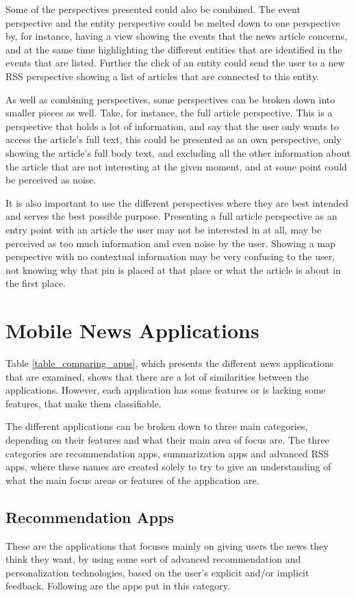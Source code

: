 Some of the perspectives presented could also be combined. The event perspective and the entity perspective could be melted down to one perspective by, for instance, having a view showing the events that the news article concerns, and at the same time highlighting the different entities that are identified in the events that are listed. Further the click of an entity could send the user to a new RSS perspective showing a list of articles that are connected to this entity.

As well as combining perspectives, some perspectives can be broken down into smaller pieces as well. Take, for instance, the full article perspective. This is a perspective that holds a lot of information, and say that the user only wants to access the article's full text, this could be presented as an own perspective, only showing the article's full body text, and excluding all the other information about the article that are not interesting at the given moment, and at some point could be perceived as noise.

It is also important to use the different perspectives where they are best intended and serves the best possible purpose. Presenting a full article perspective as an entry point with an article the user may not be interested in at all, may be perceived as too much information and even noise by the user. Showing a map perspective with no contextual information may be very confusing to the user, not knowing why that pin is placed at that place or what the article is about in the first place.

\section{Mobile News Applications}
Table \ref{table_comparing_apps}, which presents the different news applications that are examined, shows that there are a lot of similarities between the applications. However, each application has some features or is lacking some features, that make them classifiable.

The different applications can be broken down to three main categories, depending on their features and what their main area of focus are. The three categories are recommendation apps, summarization apps and advanced RSS apps, where these names are created solely to try to give an understanding of what the main focus areas or features of the application are.

\subsection{Recommendation Apps}
These are the applications that focuses mainly on giving users the news they think they want, by using some sort of advanced recommendation and personalization technologies, based on the user's explicit and/or implicit feedback. Following are the apps put in this category.

